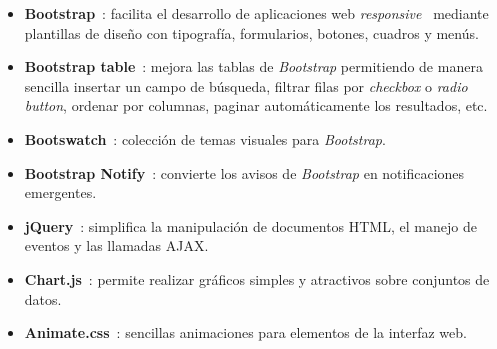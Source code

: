 \begin{itemize}
  \item \textbf{Bootstrap}~\cite{bootstrap}: facilita el desarrollo de aplicaciones web \textit{responsive}~\cite{responsive} mediante plantillas de diseño con tipografía, formularios, botones, cuadros y menús.

  \item \textbf{Bootstrap table}~\cite{bootstraptable}: mejora las tablas de \textit{Bootstrap} permitiendo de manera sencilla insertar un campo de búsqueda, filtrar filas por \textit{checkbox} o \textit{radio button}, ordenar por columnas, paginar automáticamente los resultados, etc.

  \item \textbf{Bootswatch}~\cite{bootswatch}: colección de temas visuales para \textit{Bootstrap}.

  \item \textbf{Bootstrap Notify}~\cite{bootstrapnotify}: convierte los avisos de \textit{Bootstrap} en notificaciones emergentes.

  \item \textbf{jQuery}~\cite{jquery}: simplifica la manipulación de documentos \gls{HTML}, el manejo de eventos y las llamadas \gls{AJAX}.

  \item \textbf{Chart.js}~\cite{chartjs}: permite realizar gráficos simples y atractivos sobre conjuntos de datos.

  \item \textbf{Animate.css}~\cite{animatecss}: sencillas animaciones para elementos de la interfaz web.

\end{itemize}
